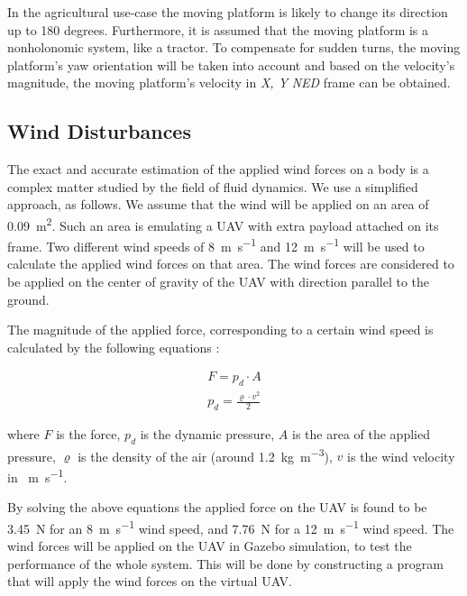 \documentclass[conference, onecolumn, draftclsnofoot]{IEEEtran}
\begin{document}
In the agricultural use-case the moving platform is likely to change
its direction up to 180 degrees. Furthermore, it is assumed that the
moving platform is a nonholonomic system, like a tractor. To
compensate for sudden turns, the moving platform's yaw orientation
will be taken into account and based on the velocity's magnitude, the
moving platform's velocity in \emph{X, Y} \emph{NED} frame can be obtained.





\subsection{Wind Disturbances}
\label{sec:WindDisturbances}

The exact and accurate estimation of the applied wind forces on a body
is a complex matter studied by the field of fluid dynamics. We use a
simplified approach, as follows. We assume that the wind will be
applied on an area of \SI{0.09}{\m^2}. Such an area is emulating a UAV
with extra payload attached on its frame. Two different wind speeds of
\SI{8}{\m \per \s} and \SI{12}{\m \per \s} will be used to calculate the applied wind forces
on that area. The wind forces are considered to be applied on the
center of gravity of the UAV with direction parallel to the ground.

The magnitude of the applied force, corresponding to a certain wind
speed is calculated by the following equations
\cite{Dynamic_pressure_NASA,anderson2010fundamentals}:

\begin{equation}
    \begin{array}{l}
         F = p_{d} \cdot A  \\
         p_{d} = \frac{\varrho \cdot v^2}{2} 
    \end{array}
\end{equation}

\noindent where $F$ is the force, \(p_{d}\) is the dynamic pressure, \(A\) is
the area of the applied pressure, \(\varrho\) is the density of the
air (around \SI{1.2}{\kg \per \m^3}), \(v\) is the wind velocity in \SI{}{\m \per \s}.

By solving the above equations the applied force on the UAV is found
to be \SI{3.45}{\newton} for an \SI{8}{\m \per \s} wind speed, and 
\SI{7.76}{\newton} for a \SI{12}{\m \per \s}
wind speed. The wind forces will be applied on the UAV in Gazebo
simulation, to test the performance of the whole system. This will be
done by constructing a program that will apply the wind forces on the
virtual UAV.
\end{document}
